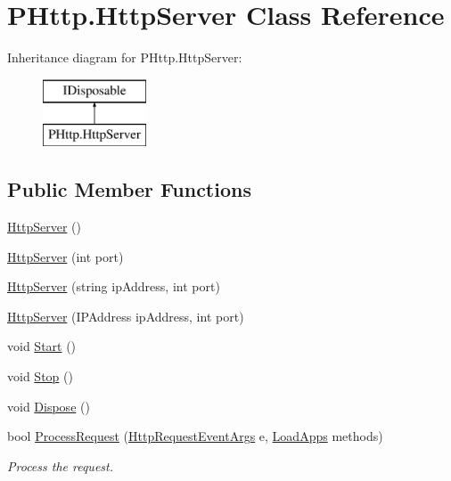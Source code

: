 \hypertarget{class_p_http_1_1_http_server}{}\section{P\+Http.\+Http\+Server Class Reference}
\label{class_p_http_1_1_http_server}
Inheritance diagram for P\+Http.\+Http\+Server\+:\begin{figure}[H]
\begin{center}
\leavevmode
\includegraphics[height=2.000000cm]{class_p_http_1_1_http_server}
\end{center}
\end{figure}
\subsection*{Public Member Functions}
\begin{DoxyCompactItemize}
\item 
\hyperlink{class_p_http_1_1_http_server_a6eda60a2a05fb5850dec16bbc620fb99}{Http\+Server} ()
\item 
\hyperlink{class_p_http_1_1_http_server_a50be37686732622c81f34cbe5a7a73e7}{Http\+Server} (int port)
\item 
\hyperlink{class_p_http_1_1_http_server_aa310a000ee6a0c85249627f9fa0f72c0}{Http\+Server} (string ip\+Address, int port)
\item 
\hyperlink{class_p_http_1_1_http_server_aca038ec73b59bc2ce28ea65072b78288}{Http\+Server} (I\+P\+Address ip\+Address, int port)
\item 
void \hyperlink{class_p_http_1_1_http_server_a28027a98dcfe8619150d883a5912b8e1}{Start} ()
\item 
void \hyperlink{class_p_http_1_1_http_server_a993be74aeea7a301e2c0bbd05882545b}{Stop} ()
\item 
void \hyperlink{class_p_http_1_1_http_server_aa5af6df141aacfb6b8a511a03885eea6}{Dispose} ()
\item 
bool \hyperlink{class_p_http_1_1_http_server_afeccf17ab6228908fd30ef6528ec43c2}{Process\+Request} (\hyperlink{class_p_http_1_1_http_request_event_args}{Http\+Request\+Event\+Args} e, \hyperlink{class_p_http_1_1_load_apps}{Load\+Apps} methods)
\begin{DoxyCompactList}\small\item\em Process the request. \end{DoxyCompactList}\end{DoxyCompactItemize}
